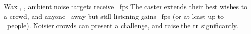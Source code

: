   {\mFate}%
  {Wax}%
  {\duplicated, \detailed, \distant}%
  {ambient noise}%
  {targets receive \rollConv~\glspl{fp}}%
  {
    The caster extends their best wishes to a crowd, and anyone \spellRange\ away but still listening gains \rollConv~\glspl{fp} (or at least up to \spellArea\ people).
    Noisier crowds can present a challenge, and raise the \gls{tn} significantly.
  }

